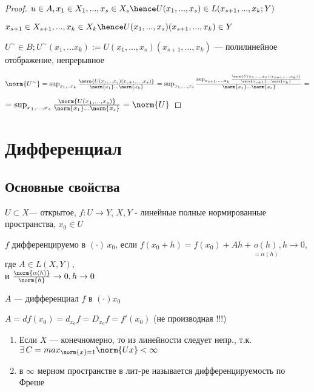 \begin{proof}
    $u \in A, x_1 \in X_1, ..., x_s \in X_s \hence U(x_1, ..., x_s) \in L(x_{s + 1}, ..., x_k; Y)$

    $x_{s + 1} \in X_{s + 1}, ..., x_k \in X_k \hence U(x_1,..., x_s)(x_{s + 1}, ..., x_{k}) \in Y$
    
    $U^{\sim} \in B;  U^{\sim} (x_1, ... x_k) := U(x_1, ..., x_s)(x_{s + 1}, ..., x_k)$ --- полилинейное отображение, непрерывное

    $\norm{U^\sim} = \sup_{x_1,..x_k} \frac{\norm{U(x_1, ... x_s)(x_{s+1}, ..., x_k)}}{\norm{x_1} ... \norm{x_k}} = \sup_{x_1, ..., x_s} \frac{ \sup_{x_{s+1}, ..., x_k} \frac{\norm{U(x_1, ..., x_s)(x_{s + 1}, ... , x_k)}}{\norm{x_{s + 1}} ... \norm{x_k}}}{\norm{x_1} ... \norm{x_s}} =$

    $ = \sup_{x_1,..., x_s}{\frac{\norm{U(x_1,...,x_s)}}{\norm{x_1} ... \norm{x_s}}} = \norm{U}$
\end{proof}


\section{Дифференциал}
\subsection{Основные свойства}
\begin{definition}
    $U \subset X$--- открытое, $f : U \to Y$, $X, Y$ - линейные полные нормированные пространства, $x_0 \in U$
    

    $f$ дифференцируемо в $(\cdot)\, x_0$, если $f(x_0 + h) = f(x_0) + Ah + \underset{ = \alpha(h)}{o(h)}, h \to 0$, где $A \in L(X, Y)$, \\ и $\frac{\norm{\alpha(h)}}{\norm{h}} \to 0, h \to 0$

    $A$ --- дифференциал $f$ в $(\cdot) x_0$

    $A = df(x_0) = d_{x_0}f = D_{x_0}f = f'(x_0)$ (не производная !!!)
\end{definition}


\newpage

\begin{remark}

\quad

\begin{enumerate}
    \item  Если $X$ --- конечномерно, то из линейности следует непр., т.к. $\exists \, C = max_{\norm{x} = 1} \norm{Ux} < \infty$
    \item \begin{definition}
        в $\infty$ мерном пространстве в лит-ре называется дифференцируемость по Фреше
    \end{definition}
\end{enumerate}
   
\end{remark}

